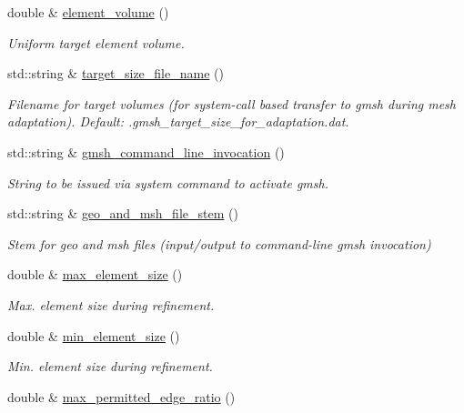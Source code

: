 \begin{DoxyCompactItemize}
double \& \hyperlink{classoomph_1_1GmshParameters_a4c085fa1661d1a27ee95461d275b686f}{element\+\_\+volume} ()
\begin{DoxyCompactList}\small\item\em Uniform target element volume. \end{DoxyCompactList}\item 
std\+::string \& \hyperlink{classoomph_1_1GmshParameters_a89c7ff40c1dd70b20b0ae22d30fe5c8a}{target\+\_\+size\+\_\+file\+\_\+name} ()
\begin{DoxyCompactList}\small\item\em Filename for target volumes (for system-\/call based transfer to gmsh during mesh adaptation). Default\+: .gmsh\+\_\+target\+\_\+size\+\_\+for\+\_\+adaptation.\+dat. \end{DoxyCompactList}\item 
std\+::string \& \hyperlink{classoomph_1_1GmshParameters_aaf19a5b331893637974f5a5be8da048c}{gmsh\+\_\+command\+\_\+line\+\_\+invocation} ()
\begin{DoxyCompactList}\small\item\em String to be issued via system command to activate gmsh. \end{DoxyCompactList}\item 
std\+::string \& \hyperlink{classoomph_1_1GmshParameters_ab9ae54d3d474392b5aefcf2a12aae1a8}{geo\+\_\+and\+\_\+msh\+\_\+file\+\_\+stem} ()
\begin{DoxyCompactList}\small\item\em Stem for geo and msh files (input/output to command-\/line gmsh invocation) \end{DoxyCompactList}\item 
double \& \hyperlink{classoomph_1_1GmshParameters_afd08195fd9f804b7ced23728b6a63e15}{max\+\_\+element\+\_\+size} ()
\begin{DoxyCompactList}\small\item\em Max. element size during refinement. \end{DoxyCompactList}\item 
double \& \hyperlink{classoomph_1_1GmshParameters_a4afd4f1f72b1f45b3ca51b186737f264}{min\+\_\+element\+\_\+size} ()
\begin{DoxyCompactList}\small\item\em Min. element size during refinement. \end{DoxyCompactList}\item 
double \& \hyperlink{classoomph_1_1GmshParameters_afe2deda55a1eb76d4f782aab9a58089c}{max\+\_\+permitted\+\_\+edge\+\_\+ratio} ()

\end{DoxyCompactItemize}
